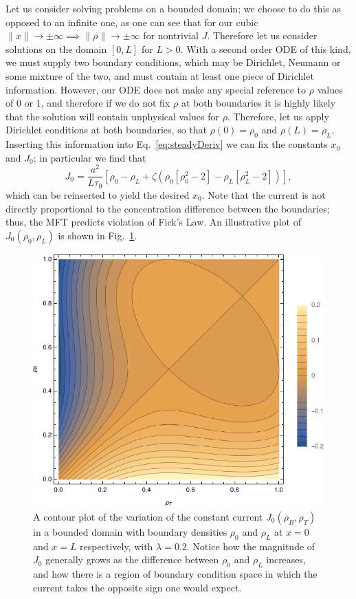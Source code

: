 Let us consider solving problems on a bounded domain; we choose to do this as opposed to an infinite one, as one can see that for our cubic $ \|x\|  \rightarrow \pm \infty \implies \|\rho\|  \rightarrow \pm \infty$ for nontrivial $J$.
Therefore let us consider solutions on the domain $[0, L]$ for $L>0$. With a second order ODE of this kind, we must supply two boundary conditions, which may be Dirichlet, Neumann or some mixture of the two,
and must contain at least one piece of Dirichlet information. However, our ODE does not make any special reference to $\rho$ values of $0$ or $1$, and therefore if we do not fix $\rho$ at both boundaries it is highly likely that the solution will contain
unphysical values for $\rho$. Therefore, let us apply Dirichlet conditions at both boundaries, so that $\rho(0) = \rho_0$ and $\rho(L) = \rho_L$. Inserting this information into Eq.~\eqref{eq:steadyDeriv} we can fix the constants
$x_0$ and $J_0$; in particular we find that
\begin{equation}
\label{eq:blockFlow}
  J_0 = \frac{a^2}{L \tau_0} \left[ \rho_0 - \rho_L + \zeta \left( \rho_0\left[\rho_0^2-2\right] - \rho_L\left[\rho_L^2-2\right] \right) \right],
\end{equation}
which can be reinserted to yield the desired $x_0$. Note that the current is not directly proportional to the
concentration difference between the boundaries; thus, the MFT predicts violation of Fick's Law.
An illustrative plot of $J_0(\rho_0, \rho_L)$ is shown in Fig.~\ref{fig:boundaryCurrent}.
\begin{figure}[h!]
 \caption[The variation in the current at fixed $\lambda$ with respect to the boundary densities.]{\label{fig:boundaryCurrent} A contour plot of the variation of the constant current $J_0(\rho_B, \rho_T)$ in a bounded domain with boundary densities $\rho_0$ and $\rho_L$ at $x=0$ and $x=L$ respectively,  with $\lambda=0.2$.
 Notice how the magnitude of $J_0$ generally grows as the difference between $\rho_0$ and $\rho_L$ increases, and how there is a region of boundary condition space in which the current takes the opposite sign one would expect.}
 \includegraphics[width=0.99\linewidth]{analytics/images/boundaryCurrent}
\end{figure}

